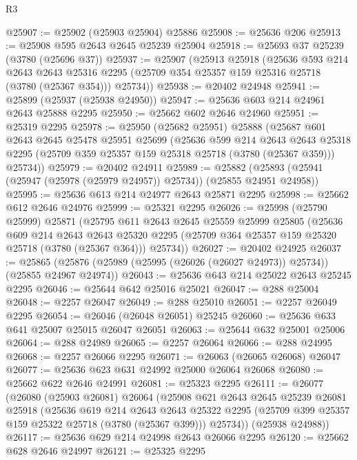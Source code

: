 \begin{lexlean}{R3}
\begin{coremodule}
@25907 := @25902 (@25903 @25904) @25886
@25908 := @25636 @206
@25913 := @25908 @595 @2643 @2645 @25239 @25904
@25918 := @25693 @37 @25239 (@3780 (@25696 @37))
@25937 := @25907
    (@25913
      @25918
      (@25636
        @593
        @214
        @2643
        @2643
        @25316
        @2295
        (@25709 @354 @25357 @159 @25316 @25718 (@3780 (@25367 @354)))
        @25734))
@25938 := @20402 @24948
@25941 := @25899 (@25937 (@25938 @24950))
@25947 := @25636 @603 @214 @24961 @2643 @25888 @2295
@25950 := @25662 @602 @2646 @24960
@25951 := @25319 @2295
@25978 := @25950
    (@25682 @25951)
    @25888
    (@25687
      @601
      @2643
      @2645
      @25478
      @25951
      @25699
      (@25636
        @599
        @214
        @2643
        @2643
        @25318
        @2295
        (@25709 @359 @25357 @159 @25318 @25718 (@3780 (@25367 @359)))
        @25734))
@25979 := @20402 @24911
@25989 := @25882 (@25893 (@25941 (@25947 (@25978 (@25979 @24957)) @25734)) (@25855 @24951 @24958))
@25995 := @25636 @613 @214 @24977 @2643 @25871 @2295
@25998 := @25662 @612 @2646 @24976
@25999 := @25321 @2295
@26026 := @25998
    (@25790 @25999)
    @25871
    (@25795
      @611
      @2643
      @2645
      @25559
      @25999
      @25805
      (@25636
        @609
        @214
        @2643
        @2643
        @25320
        @2295
        (@25709 @364 @25357 @159 @25320 @25718 (@3780 (@25367 @364)))
        @25734))
@26027 := @20402 @24925
@26037 := @25865 (@25876 (@25989 (@25995 (@26026 (@26027 @24973)) @25734)) (@25855 @24967 @24974))
@26043 := @25636 @643 @214 @25022 @2643 @25245 @2295
@26046 := @25644 @642 @25016 @25021
@26047 := @288 @25004
@26048 := @2257 @26047
@26049 := @288 @25010
@26051 := @2257 @26049 @2295
@26054 := @26046 (@26048 @26051) @25245
@26060 := @25636 @633 @641 @25007 @25015 @26047 @26051
@26063 := @25644 @632 @25001 @25006
@26064 := @288 @24989
@26065 := @2257 @26064
@26066 := @288 @24995
@26068 := @2257 @26066 @2295
@26071 := @26063 (@26065 @26068) @26047
@26077 := @25636 @623 @631 @24992 @25000 @26064 @26068
@26080 := @25662 @622 @2646 @24991
@26081 := @25323 @2295
@26111 := @26077
    (@26080
      (@25903 @26081)
      @26064
      (@25908
        @621
        @2643
        @2645
        @25239
        @26081
        @25918
        (@25636
          @619
          @214
          @2643
          @2643
          @25322
          @2295
          (@25709 @399 @25357 @159 @25322 @25718 (@3780 (@25367 @399)))
          @25734))
      (@25938 @24988))
@26117 := @25636 @629 @214 @24998 @2643 @26066 @2295
@26120 := @25662 @628 @2646 @24997
@26121 := @25325 @2295

\end{coremodule}
\end{lexlean}
